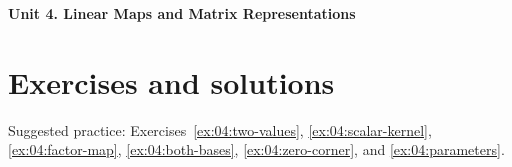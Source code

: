 \documentclass[12pt]{article}
\begin{document}
{\Large\bfseries Unit 4. Linear Maps and Matrix Representations}\par

\clearpage
\section*{Exercises and solutions}
Suggested practice: Exercises~\ref{ex:04:two-values},
\ref{ex:04:scalar-kernel}, \ref{ex:04:factor-map},
\ref{ex:04:both-bases}, \ref{ex:04:zero-corner}, and
\ref{ex:04:parameters}.

\end{document}
